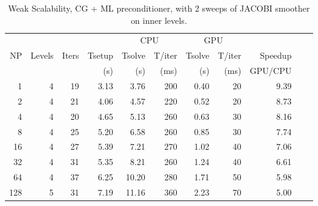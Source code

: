 \begin{table}[h!]
\centering
\label{gpu-jac}
\begin{tabular}{rrrrrrrrrrr}
    &        &       &        & \multicolumn{2}{c}{CPU} &\multicolumn{2}{c}{GPU} & \\
NP  & Levels & Iters & Tsetup & Tsolve & T/iter & Tsolve & T/iter  & Speedup\\
    &        &       & (s)    & (s)    & (ms)   & (s)    & (ms)    & GPU/CPU \\
\hline
1   & 4       & 19  & 3.13  & 3.76  & 200 & 0.40 & 20   & 9.39  \\
2   & 4       & 21  & 4.06  & 4.57  & 220 & 0.52 & 20   & 8.73  \\
4   & 4       & 20  & 4.65  & 5.13  & 260 & 0.63 & 30   & 8.16  \\
8   & 4       & 25  & 5.20  & 6.58  & 260 & 0.85 & 30   & 7.74  \\
16  & 4       & 27  & 5.39  & 7.21  & 270 & 1.02 & 40   & 7.06  \\
32  & 4       & 31  & 5.35  & 8.21  & 260 & 1.24 & 40   & 6.61  \\
64  & 4       & 37  & 6.25  & 10.20 & 280 & 1.71 & 50   & 5.98  \\ 
128 & 5       & 31  & 7.19  & 11.16 & 360 & 2.23 & 70   & 5.00  \\
\hline
\end{tabular}
\caption{Weak Scalability,  CG + ML preconditioner,  with 2 sweeps of JACOBI smoother on inner levels.}
\end{table}
\fi

